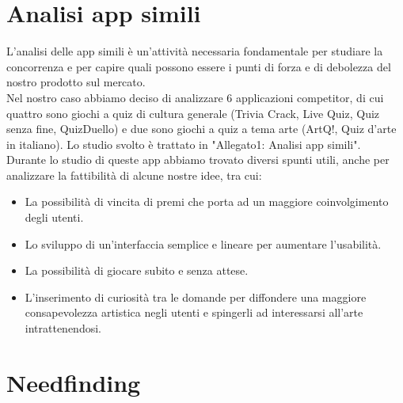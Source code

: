\documentclass{article}
\begin{document}
\section{Analisi app simili}
L’analisi delle app simili è un’attività necessaria fondamentale per studiare la concorrenza e per capire quali possono essere i punti di forza e di debolezza del nostro prodotto sul mercato.\\\indent
Nel nostro caso abbiamo deciso di analizzare 6 applicazioni competitor, di cui quattro sono giochi a quiz di cultura generale (Trivia Crack, Live Quiz, Quiz senza fine, QuizDuello) e due sono giochi a quiz a tema arte (ArtQ!, Quiz d’arte in italiano). Lo studio svolto è trattato in "Allegato1: Analisi app simili"\cite{Allegato1}.
\\\indent
Durante lo studio di queste app abbiamo trovato diversi spunti utili, anche per analizzare la fattibilità di alcune nostre idee, tra cui:
\begin{itemize}
\item La possibilità di vincita di premi che porta ad un maggiore coinvolgimento degli utenti.
\item Lo sviluppo di un’interfaccia semplice e lineare per aumentare l’usabilità.
\item La possibilità di giocare subito e senza attese.
\item L’inserimento di curiosità tra le domande per diffondere una maggiore consapevolezza artistica negli utenti e spingerli ad interessarsi all’arte intrattenendosi.
\end{itemize}

\section{Needfinding}
\end{document}
